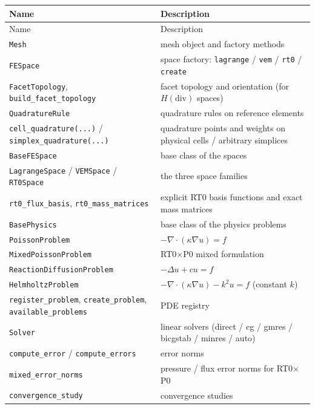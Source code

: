 \documentclass[11pt,oneside]{book}
\theoremstyle{definition}
\theoremstyle{plain}
\newcommand{\code}[1]{\texttt{#1}}
\begin{document}
\begingroup\footnotesize
\begin{longtable}{@{}L{5.0cm}L{9.4cm}@{}}
\toprule
Name & Description \\
\midrule
\endfirsthead
\toprule
Name & Description \\
\midrule
\endhead
\code{Mesh} & mesh object and factory methods \\
\code{FESpace} & space factory: \code{lagrange} / \code{vem} / \code{rt0} / \code{create} \\
\code{FacetTopology}, \code{build\_\allowbreak facet\_\allowbreak topology} & facet topology and orientation (for $H(\mathrm{div})$ spaces) \\
\code{QuadratureRule} & quadrature rules on reference elements \\
\code{cell\_\allowbreak quadrature(...)} / \code{simplex\_\allowbreak quadrature(...)} & quadrature points and weights on physical cells / arbitrary simplices \\
\code{BaseFESpace} & base class of the spaces \\
\code{LagrangeSpace} / \code{VEMSpace} / \code{RT0Space} & the three space families \\
\code{rt0\_\allowbreak flux\_\allowbreak basis}, \code{rt0\_\allowbreak mass\_\allowbreak matrices} & explicit RT0 basis functions and exact mass matrices \\
\code{BasePhysics} & base class of the physics problems \\
\code{PoissonProblem} & $-\nabla\cdot(\kappa\nabla u)=f$ \\
\code{MixedPoissonProblem} & RT0$\times$P0 mixed formulation \\
\code{ReactionDiffusionProblem} & $-\Delta u+cu=f$ \\
\code{HelmholtzProblem} & $-\nabla\cdot(\kappa\nabla u)-k^2u=f$ (constant $k$) \\
\code{register\_\allowbreak problem}, \code{create\_\allowbreak problem}, \code{available\_\allowbreak problems} & PDE registry \\
\code{Solver} & linear solvers (direct / cg / gmres / bicgstab / minres / auto) \\
\code{compute\_\allowbreak error} / \code{compute\_\allowbreak errors} & error norms \\
\code{mixed\_\allowbreak error\_\allowbreak norms} & pressure / flux error norms for RT0$\times$P0 \\
\code{convergence\_\allowbreak study} & convergence studies \\

\end{longtable}
\end{document}
